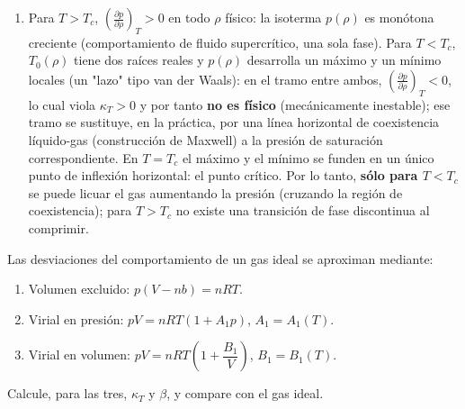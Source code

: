 \documentclass[12pt,a4paper]{article}
\newcommand{\paren}[1]{\left( #1 \right)}
\newcommand{\pd}[3]{\left(\frac{\partial #1}{\partial #2}\right)_{#3}}
\begin{document}
\begin{solucion}
\begin{enumerate}
            se obtiene de $dT_{0}/d\rho=0$: $1-2\gamma\rho=0\implies\rho_{c}=1/(2\gamma)$, y
            \begin{equation*}
                T_{c}=T_{0}(\rho_{c})=\frac{\alpha}{4k_{B}\gamma}.
            \end{equation*}
            Invirtiendo estas relaciones,
            \begin{equation*}
                \gamma=\frac{1}{2\rho_{c}} \implies \boxed{b=\frac{N_{A}}{2\rho_{c}},}
                \qquad
                \alpha=4k_{B}\gamma T_{c}=\frac{2k_{B}T_{c}}{\rho_{c}} \implies \boxed{a=\frac{2N_{A}RT_{c}}{\rho_{c}}.}
            \end{equation*}
            Comparando con $T_{B}=\alpha/(k_{B}\gamma)$ y $T_{c}=\alpha/(4k_{B}\gamma)$,
            \begin{equation*}
                \boxed{T_{B}=4T_{c}.}
            \end{equation*}
            \item[5)] Para $T>T_{c}$, $\pd p\rho T>0$ en todo $\rho$ físico: la isoterma
            $p(\rho)$ es monótona creciente (comportamiento de fluido supercrítico, una sola
            fase). Para $T<T_{c}$, $T_{0}(\rho)$ tiene dos raíces reales y $p(\rho)$ desarrolla
            un máximo y un mínimo locales (un "lazo" tipo van der Waals): en el tramo entre
            ambos, $\pd p\rho T<0$, lo cual viola $\kappa_{T}>0$ y por tanto \textbf{no es
            físico} (mecánicamente inestable); ese tramo se sustituye, en la práctica, por una
            línea horizontal de coexistencia líquido-gas (construcción de Maxwell) a la presión
            de saturación correspondiente. En $T=T_{c}$ el máximo y el mínimo se funden en un
            único punto de inflexión horizontal: el punto crítico. Por lo tanto, \textbf{sólo
            para $T<T_{c}$} se puede licuar el gas aumentando la presión (cruzando la región de
            coexistencia); para $T>T_{c}$ no existe una transición de fase discontinua al
            comprimir.
        \end{enumerate}
    \end{solucion}

    \begin{problema}
        Las desviaciones del comportamiento de un gas ideal se aproximan mediante:
        \begin{enumerate}
            \item[1)] Volumen excluido: $p(V-nb)=nRT$.
            \item[2)] Virial en presión: $pV=nRT(1+A_{1}p)$, $A_{1}=A_{1}(T)$.
            \item[3)] Virial en volumen: $pV=nRT\paren{1+\dfrac{B_{1}}{V}}$, $B_{1}=B_{1}(T)$.
        \end{enumerate}
        Calcule, para las tres, $\kappa_{T}$ y $\beta$, y compare con el gas ideal.
    \end{problema}
\end{document}
